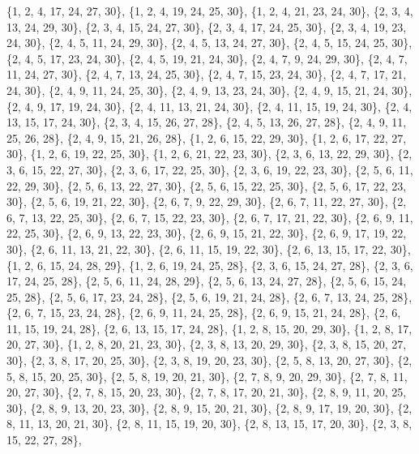 \documentclass[11pt,a4paper]{article}
\begin{document}
{\{1, 2, 4, 17, 24, 27, 30\}, \{1, 2, 4, 19, 24, 25, 30\}, \{1, 2, 4, 21, 23, 24, 30\}, \{2, 3, 4, 13, 24, 29, 30\}, \{2, 3, 4, 15, 24, 27, 30\},
\{2, 3, 4, 17, 24, 25, 30\}, \{2, 3, 4, 19, 23, 24, 30\}, \{2, 4, 5, 11, 24, 29, 30\}, \{2, 4, 5, 13, 24, 27, 30\}, \{2, 4, 5, 15, 24, 25, 30\},
\{2, 4, 5, 17, 23, 24, 30\}, \{2, 4, 5, 19, 21, 24, 30\}, \{2, 4, 7, 9, 24, 29, 30\}, \{2, 4, 7, 11, 24, 27, 30\}, \{2, 4, 7, 13, 24, 25, 30\},
\{2, 4, 7, 15, 23, 24, 30\}, \{2, 4, 7, 17, 21, 24, 30\}, \{2, 4, 9, 11, 24, 25, 30\}, \{2, 4, 9, 13, 23, 24, 30\}, \{2, 4, 9, 15, 21, 24, 30\},
\{2, 4, 9, 17, 19, 24, 30\}, \{2, 4, 11, 13, 21, 24, 30\}, \{2, 4, 11, 15, 19, 24, 30\}, \{2, 4, 13, 15, 17, 24, 30\}, \{2, 3, 4, 15, 26, 27, 28\},
\{2, 4, 5, 13, 26, 27, 28\}, \{2, 4, 9, 11, 25, 26, 28\}, \{2, 4, 9, 15, 21, 26, 28\}, \{1, 2, 6, 15, 22, 29, 30\}, \{1, 2, 6, 17, 22, 27, 30\},
\{1, 2, 6, 19, 22, 25, 30\}, \{1, 2, 6, 21, 22, 23, 30\}, \{2, 3, 6, 13, 22, 29, 30\}, \{2, 3, 6, 15, 22, 27, 30\}, \{2, 3, 6, 17, 22, 25, 30\},
\{2, 3, 6, 19, 22, 23, 30\}, \{2, 5, 6, 11, 22, 29, 30\}, \{2, 5, 6, 13, 22, 27, 30\}, \{2, 5, 6, 15, 22, 25, 30\}, \{2, 5, 6, 17, 22, 23, 30\},
\{2, 5, 6, 19, 21, 22, 30\}, \{2, 6, 7, 9, 22, 29, 30\}, \{2, 6, 7, 11, 22, 27, 30\}, \{2, 6, 7, 13, 22, 25, 30\}, \{2, 6, 7, 15, 22, 23, 30\},
\{2, 6, 7, 17, 21, 22, 30\}, \{2, 6, 9, 11, 22, 25, 30\}, \{2, 6, 9, 13, 22, 23, 30\}, \{2, 6, 9, 15, 21, 22, 30\}, \{2, 6, 9, 17, 19, 22, 30\},
\{2, 6, 11, 13, 21, 22, 30\}, \{2, 6, 11, 15, 19, 22, 30\}, \{2, 6, 13, 15, 17, 22, 30\}, \{1, 2, 6, 15, 24, 28, 29\}, \{1, 2, 6, 19, 24, 25, 28\},
\{2, 3, 6, 15, 24, 27, 28\}, \{2, 3, 6, 17, 24, 25, 28\}, \{2, 5, 6, 11, 24, 28, 29\}, \{2, 5, 6, 13, 24, 27, 28\}, \{2, 5, 6, 15, 24, 25, 28\},
\{2, 5, 6, 17, 23, 24, 28\}, \{2, 5, 6, 19, 21, 24, 28\}, \{2, 6, 7, 13, 24, 25, 28\}, \{2, 6, 7, 15, 23, 24, 28\}, \{2, 6, 9, 11, 24, 25, 28\},
\{2, 6, 9, 15, 21, 24, 28\}, \{2, 6, 11, 15, 19, 24, 28\}, \{2, 6, 13, 15, 17, 24, 28\}, \{1, 2, 8, 15, 20, 29, 30\}, \{1, 2, 8, 17, 20, 27, 30\},
\{1, 2, 8, 20, 21, 23, 30\}, \{2, 3, 8, 13, 20, 29, 30\}, \{2, 3, 8, 15, 20, 27, 30\}, \{2, 3, 8, 17, 20, 25, 30\}, \{2, 3, 8, 19, 20, 23, 30\},
\{2, 5, 8, 13, 20, 27, 30\}, \{2, 5, 8, 15, 20, 25, 30\}, \{2, 5, 8, 19, 20, 21, 30\}, \{2, 7, 8, 9, 20, 29, 30\}, \{2, 7, 8, 11, 20, 27, 30\},
\{2, 7, 8, 15, 20, 23, 30\}, \{2, 7, 8, 17, 20, 21, 30\}, \{2, 8, 9, 11, 20, 25, 30\}, \{2, 8, 9, 13, 20, 23, 30\}, \{2, 8, 9, 15, 20, 21, 30\},
\{2, 8, 9, 17, 19, 20, 30\}, \{2, 8, 11, 13, 20, 21, 30\}, \{2, 8, 11, 15, 19, 20, 30\}, \{2, 8, 13, 15, 17, 20, 30\}, \{2, 3, 8, 15, 22, 27, 28\},
}
\end{document}
